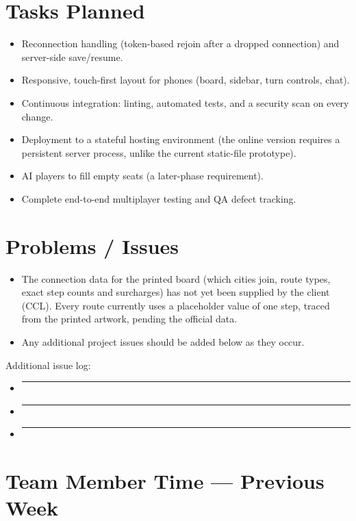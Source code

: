 \documentclass[11pt]{article}
\begin{document}
\section{Tasks Planned}

\begin{itemize}[leftmargin=1.4em]
  \item Reconnection handling (token-based rejoin after a dropped connection) and server-side save/resume.
  \item Responsive, touch-first layout for phones (board, sidebar, turn controls, chat).
  \item Continuous integration: linting, automated tests, and a security scan on every change.
  \item Deployment to a stateful hosting environment (the online version requires a persistent server process, unlike the current static-file prototype).
  \item AI players to fill empty seats (a later-phase requirement).
  \item Complete end-to-end multiplayer testing and QA defect tracking.
\end{itemize}

\section{Problems / Issues}

\begin{itemize}[leftmargin=1.4em]
  \item The connection data for the printed board (which cities join, route types, exact step counts and surcharges) has not yet been supplied by the client (CCL). Every route currently uses a placeholder value of one step, traced from the printed artwork, pending the official data.
  \item Any additional project issues should be added below as they occur.
\end{itemize}

\noindent Additional issue log:
\begin{itemize}[leftmargin=1.4em]
  \item \rule{0.82\linewidth}{0.4pt}
  \item \rule{0.82\linewidth}{0.4pt}
  \item \rule{0.82\linewidth}{0.4pt}
\end{itemize}

\section{Team Member Time --- Previous Week}
\end{document}
